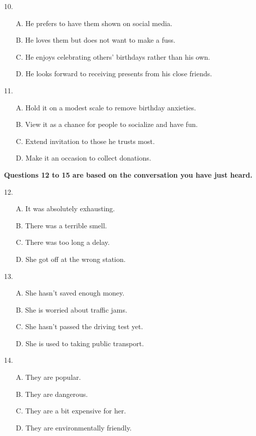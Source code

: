 \documentclass[UTF8,11pt]{ctexart}
\begin{document}
10.


\begin{itemize}[leftmargin=2em,itemsep=.2em,topsep=.4em]\item[A.] He prefers to have them shown on social media.
\item[B.] He loves them but does not want to make a fuss.
\item[C.] He enjoys celebrating others' birthdays rather than his own.
\item[D.] He looks forward to receiving presents from his close friends.
\end{itemize}

11.


\begin{itemize}[leftmargin=2em,itemsep=.2em,topsep=.4em]\item[A.] Hold it on a modest scale to remove birthday anxieties.
\item[B.] View it as a chance for people to socialize and have fun.
\item[C.] Extend invitation to those he trusts most.
\item[D.] Make it an occasion to collect donations.
\end{itemize}

\textbf{Questions 12 to 15 are based on the conversation you have just heard.}


12.


\begin{itemize}[leftmargin=2em,itemsep=.2em,topsep=.4em]\item[A.] It was absolutely exhausting.
\item[B.] There was a terrible smell.
\item[C.] There was too long a delay.
\item[D.] She got off at the wrong station.
\end{itemize}

13.


\begin{itemize}[leftmargin=2em,itemsep=.2em,topsep=.4em]\item[A.] She hasn't saved enough money.
\item[B.] She is worried about traffic jams.
\item[C.] She hasn't passed the driving test yet.
\item[D.] She is used to taking public transport.
\end{itemize}

14.


\begin{itemize}[leftmargin=2em,itemsep=.2em,topsep=.4em]\item[A.] They are popular.
\item[B.] They are dangerous.
\item[C.] They are a bit expensive for her.
\item[D.] They are environmentally friendly.
\end{itemize}
\end{document}
